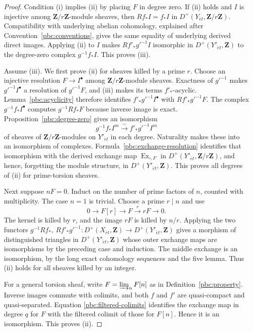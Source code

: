 \documentclass[11pt,a4paper]{article}
\numberwithin{equation}{section}
\theoremstyle{definition}
\theoremstyle{remark}
\newcommand{\D}{D}
\newcommand{\et}{\acute{e}t}
\newcommand{\Z}{\mathbf Z}
\begin{document}
\begin{proof}
Condition (i) implies (ii) by placing $F$ in degree zero. If (ii)
holds and $I$ is injective among $\Z/r\Z$-module sheaves, then
$Rf_*I=f_*I$ in $\D^+(Y_{\et},\Z/r\Z)$. Compatibility with
underlying abelian cohomology, explained after
Convention~\ref{pbc:conventions}, gives the same equality of underlying
derived direct images. Applying (ii) to $I$ makes
$Rf'_*g'^{-1}I$ isomorphic in $\D^+(Y'_{\et},\Z)$ to the degree-zero
complex $g^{-1}f_*I$.
This proves (iii).

Assume (iii). We first prove (ii) for sheaves killed by a prime $r$.
Choose an injective resolution $F\to I^\bullet$ among
$\Z/r\Z$-module sheaves. Exactness of $g'^{-1}$ makes
$g'^{-1}I^\bullet$ a resolution of $g'^{-1}F$, and (iii) makes its
terms $f'_*$-acyclic. Lemma~\ref{pbc:acyclicity} therefore identifies
$f'_*g'^{-1}I^\bullet$ with $Rf'_*g'^{-1}F$. The complex
$g^{-1}f_*I^\bullet$ computes $g^{-1}Rf_*F$ because inverse image
is exact. Proposition~\ref{pbc:degree-zero} gives an isomorphism
\[
 g^{-1}f_*I^m\xrightarrow{\sim} f'_*g'^{-1}I^m
\]
of sheaves of $\Z/r\Z$-modules on $Y'_{\et}$ in each degree.
Naturality makes these into an isomorphism of complexes.
Formula~\eqref{pbc:exchange-resolution} identifies that isomorphism with
the derived exchange map $\operatorname{Ex}_{\square,F}$ in
$\D^+(Y'_{\et},\Z/r\Z)$, and hence, forgetting the module structure, in
$\D^+(Y'_{\et},\Z)$. This proves all degrees
of (ii) for prime-torsion sheaves.

Next suppose $nF=0$. Induct on the number of prime factors of $n$,
counted with multiplicity. The case $n=1$ is trivial. Choose a prime
$r\mid n$ and use
\[
 0\longrightarrow F[r]\longrightarrow F
 \xrightarrow{r}rF\longrightarrow0.
\]
The kernel is killed by $r$, and the image $rF$ is killed by $n/r$.
Applying the two functors
$g^{-1}Rf_*,\ Rf'_*g'^{-1}\colon\D^+(X_{\et},\Z)\to\D^+(Y'_{\et},\Z)$
gives a morphism of distinguished triangles in $\D^+(Y'_{\et},\Z)$ whose outer exchange maps are isomorphisms by the preceding
case and induction. The middle exchange is an isomorphism, by the
long exact cohomology sequences and the five lemma. Thus (ii) holds
for all sheaves killed by an integer.

For a general torsion sheaf, write $F=\varinjlim_n F[n]$ as in
Definition~\ref{pbc:property}. Inverse images commute with colimits,
and both $f$ and $f'$ are quasi-compact and quasi-separated. Equation
\eqref{pbc:filtered-colimits} identifies the exchange map in degree
$q$ for $F$ with the filtered colimit of those for $F[n]$. Hence it
is an isomorphism. This proves (ii).


\end{proof}
\end{document}
